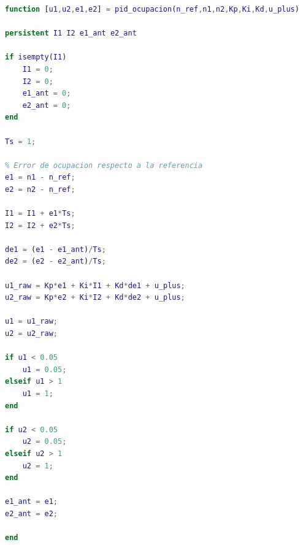 \begin{lstlisting}[language=Matlab,caption={Funcion del PID local de ocupacion para las esteras R2ET},label={lst:pid_ocupacion}]
function [u1,u2,e1,e2] = pid_ocupacion(n_ref,n1,n2,Kp,Ki,Kd,u_plus)

persistent I1 I2 e1_ant e2_ant

if isempty(I1)
    I1 = 0;
    I2 = 0;
    e1_ant = 0;
    e2_ant = 0;
end

Ts = 1;

% Error de ocupacion respecto a la referencia
e1 = n1 - n_ref;
e2 = n2 - n_ref;

I1 = I1 + e1*Ts;
I2 = I2 + e2*Ts;

de1 = (e1 - e1_ant)/Ts;
de2 = (e2 - e2_ant)/Ts;

u1_raw = Kp*e1 + Ki*I1 + Kd*de1 + u_plus;
u2_raw = Kp*e2 + Ki*I2 + Kd*de2 + u_plus;

u1 = u1_raw;
u2 = u2_raw;

if u1 < 0.05
    u1 = 0.05;
elseif u1 > 1
    u1 = 1;
end

if u2 < 0.05
    u2 = 0.05;
elseif u2 > 1
    u2 = 1;
end

e1_ant = e1;
e2_ant = e2;

end
\end{lstlisting}

